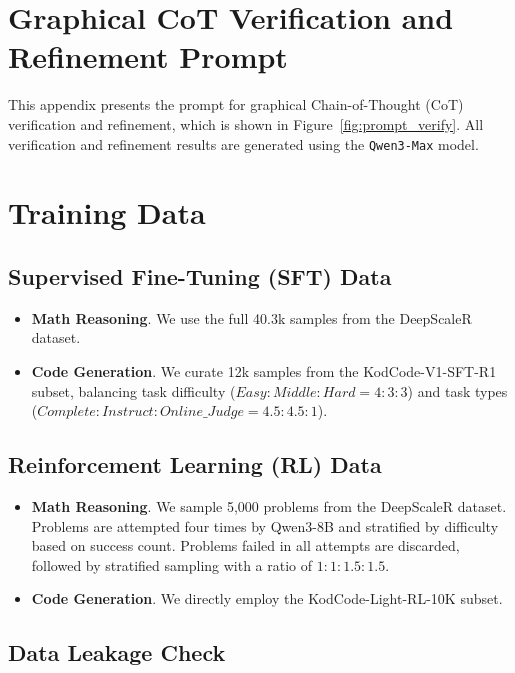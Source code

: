 \section{Graphical CoT Verification and Refinement Prompt}
\label{app:verify}

This appendix presents the prompt for graphical Chain-of-Thought (CoT)
verification and refinement, which is shown in Figure~\ref{fig:prompt_verify}. All verification and refinement results are generated using the \texttt{Qwen3-Max} model.

\section{Training Data}
\label{app:training_data}

\subsection{Supervised Fine-Tuning (SFT) Data}
\begin{itemize}
    \item \textbf{Math Reasoning}.
    We use the full 40.3k samples from the DeepScaleR dataset.
    
    \item \textbf{Code Generation}.
    We curate 12k samples from the KodCode-V1-SFT-R1 subset,
    balancing task difficulty
    ($Easy:Middle:Hard = 4:3:3$)
    and task types
    ($Complete:Instruct:Online\_Judge = 4.5:4.5:1$).
\end{itemize}

\subsection{Reinforcement Learning (RL) Data}
\begin{itemize}
    \item \textbf{Math Reasoning}.
    We sample 5,000 problems from the DeepScaleR dataset.
    Problems are attempted four times by Qwen3-8B and stratified by difficulty
    based on success count.
    Problems failed in all attempts are discarded, followed by stratified
    sampling with a ratio of $1:1:1.5:1.5$.
    
    \item \textbf{Code Generation}.
    We directly employ the KodCode-Light-RL-10K subset.
\end{itemize}

\subsection{Data Leakage Check}
\label{app:data_leakage}

